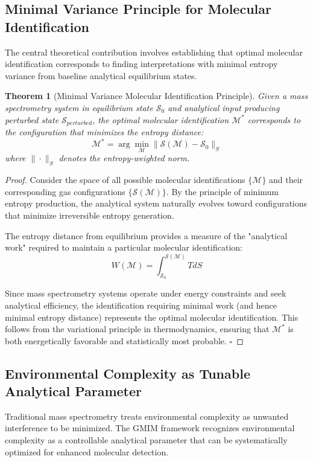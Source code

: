 \documentclass[11pt,a4paper]{article}
\newtheorem{theorem}{Theorem}[section]
\theoremstyle{remark}
\begin{document}
\subsection{Minimal Variance Principle for Molecular Identification}

The central theoretical contribution involves establishing that optimal molecular identification corresponds to finding interpretations with minimal entropy variance from baseline analytical equilibrium states.

\begin{theorem}[Minimal Variance Molecular Identification Principle]
Given a mass spectrometry system in equilibrium state $\mathcal{S}_0$ and analytical input producing perturbed state $\mathcal{S}_{perturbed}$, the optimal molecular identification $\mathcal{M}^*$ corresponds to the configuration that minimizes the entropy distance:
$$\mathcal{M}^* = \arg\min_{\mathcal{M}} \|\mathcal{S}(\mathcal{M}) - \mathcal{S}_0\|_S$$
where $\|\cdot\|_S$ denotes the entropy-weighted norm.
\end{theorem}

\begin{proof}
Consider the space of all possible molecular identifications $\{\mathcal{M}\}$ and their corresponding gas configurations $\{\mathcal{S}(\mathcal{M})\}$. By the principle of minimum entropy production, the analytical system naturally evolves toward configurations that minimize irreversible entropy generation.

The entropy distance from equilibrium provides a measure of the "analytical work" required to maintain a particular molecular identification:
$$W(\mathcal{M}) = \int_{\mathcal{S}_0}^{\mathcal{S}(\mathcal{M})} T dS$$

Since mass spectrometry systems operate under energy constraints and seek analytical efficiency, the identification requiring minimal work (and hence minimal entropy distance) represents the optimal molecular identification. This follows from the variational principle in thermodynamics, ensuring that $\mathcal{M}^*$ is both energetically favorable and statistically most probable. $\square$
\end{proof}

\subsection{Environmental Complexity as Tunable Analytical Parameter}

Traditional mass spectrometry treats environmental complexity as unwanted interference to be minimized. The GMIM framework recognizes environmental complexity as a controllable analytical parameter that can be systematically optimized for enhanced molecular detection.
\end{document}
